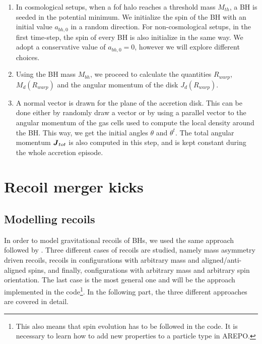 \documentclass[a4,useAMS,usenatbib,usegraphicx,12pt]{article}
\begin{document}
\begin{enumerate}
 \item In cosmological setups, when a fof halo reaches a threshold mass $M_{th}$, a BH is seeded in
 the potential minimum. We initialize the spin of the BH with an initial value $a_{bh,0}$ in a
 random direction. For non-cosmological setups, in the first time-step, the spin of every BH is also
 initialize in the same way. We adopt a conservative value of $a_{bh,0} = 0$, however we will explore
 different choices.
 
 \item Using the BH mass $M_{bh}$, we proceed to calculate the quantities $R_{warp}$, $M_d(R_{warp})$
 and the angular momentum of the disk $J_d(R_{warp})$.
 
 \item A normal vector is drawn for the plane of the accretion disk. This can be done either by 
 randomly draw a vector or by using a parallel vector to the angular momentum of the gas cells used 
 to compute the local density around the BH. This way, we get the initial angles $\theta$ and 
 $\theta^t$. The total angular momentum $\boldsymbol{ J }_{tot}$ is also computed in this step, and is kept
 constant during the whole accretion episode.
 


\end{enumerate}






\section{Recoil merger kicks}

\subsection{Modelling recoils}

In order to model gravitational recoils of BHs, we used the same approach followed by \citet{Sijacki2009}.
Three different cases of recoils are studied, namely mass asymmetry driven recoils, recoils in 
configurations with arbitrary mass and aligned/anti-aligned spins, and finally, configurations with
arbitrary mass and arbitrary spin orientation. The last case is the most general one and will be the 
approach implemented in the code\footnote{This also means that spin evolution has to be followed in 
the code. It is necessary to learn how to add new properties to a particle type in AREPO.}. In the
following part, the three different approaches are covered in detail.
\end{document}
